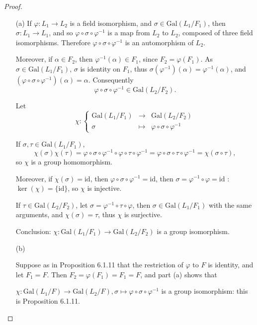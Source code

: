 \documentclass[11pt,a4paper]{article}
\begin{document}
\begin{proof}
\begin{enumerate}
\item[(a)]
If $\varphi : L_1 \to L_2$ is a field isomorphism, and $\sigma \in \mathrm{Gal}(L_1/F_1)$, then ${\sigma : L_1 \to L_1}$, and so $\varphi \circ \sigma \circ \varphi^{-1}$ is a map from $L_2$ to $L_2$, composed of three field isomorphisms. Therefore $\varphi \circ \sigma \circ \varphi^{-1}$ is an automorphism of $L_2$.

Moreover, if $\alpha \in F_2$, then $\varphi^{-1}(\alpha) \in F_1$, since $F_2 = \varphi(F_1)$. As $\sigma \in \mathrm{Gal}(L_1/F_1)$, $\sigma$ is identity on $F_1$, thus $\sigma ( \varphi^{-1})(\alpha) = \varphi^{-1}(\alpha)$, and $(\varphi \circ \sigma \circ \varphi^{-1}) (\alpha) = \alpha$. Consequently $$\varphi \circ \sigma \circ \varphi^{-1} 
\in  \mathrm{Gal}(L_2/F_2).$$

Let
$$
\chi : 
\left\{
\begin{array}{ccc}
 \mathrm{Gal}(L_1/F_1) & \to  &  \mathrm{Gal}(L_2/F_2) \\
 \sigma  &\mapsto    &  \varphi \circ \sigma \circ \varphi^{-1}
\end{array}
\right.
$$

If $\sigma,\tau \in  \mathrm{Gal}(L_1/F_1)$, $$\chi(\sigma) \chi(\tau) = \varphi \circ \sigma \circ \varphi^{-1} \circ \varphi \circ \tau  \circ \varphi^{-1} =  \varphi \circ \sigma \circ \tau  \circ \varphi^{-1} = \chi(\sigma \circ \tau),$$
so $\chi$ is a group homomorphism.

Moreover, if $\chi(\sigma) = \mathrm{id}$, then $\varphi \circ \sigma \circ \varphi^{-1} = \mathrm{id}$, 
then $\sigma = \varphi^{-1} \circ \varphi = \mathrm{id}$ : $\ker(\chi) = \{\mathrm{id}\}$, so $\chi$ is injective.

If $\tau \in  \mathrm{Gal}(L_2/F_2)$, let $\sigma = \varphi^{-1} \circ \tau \circ \varphi$, then $\sigma \in  \mathrm{Gal}(L_1/F_1)$ with the same arguments, and $\chi(\sigma) = \tau$, thus $\chi$ is surjective.

Conclusion: $\chi : \mathrm{Gal}(L_1/F_1)  \to    \mathrm{Gal}(L_2/F_2)$ is a group isomorphism.

\item[(b)]

Suppose as in  Proposition 6.1.11 that the restriction of $\varphi$ to $F$ is identity, and let $F_1 = F$. Then $F_2 = \varphi(F_1) = F_1 = F$, and part (a) shows that

$\chi : \mathrm{Gal}(L_1/F)  \to    \mathrm{Gal}(L_2/F),\sigma  \mapsto      \varphi \circ \sigma \circ \varphi^{-1}$ is a group isomorphism: this is Proposition 6.1.11.

\end{enumerate}
\end{proof}
\end{document}

